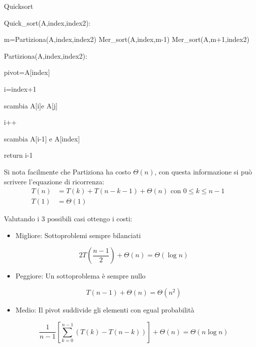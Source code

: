 \documentclass{article}
\begin{document}
\begin{algorithm}[ht]
\caption{Quicksort}
\begin{algorithmic}
\State Quick\_sort(A,index,index2):


        \State m=Partiziona(A,index,index2)
        \State Mer\_sort(A,index,m-1)
        \State Mer\_sort(A,m+1,index2)

    \EndIf

\State

\State Partiziona(A,index,index2): 

    \State pivot=A[index]

    \State i=index+1



            \State scambia A[i]e A[j]

            \State i++

        \EndIf

    \EndFor

\State scambia A[i-1] e A[index]

\State return i-1

\end{algorithmic}
\end{algorithm}

\noindent Si nota facilmente che Partiziona ha costo $\Theta(n)$, con questa informazione si può scrivere l'equazione di ricorrenza:
\begin{equation}
    \nonumber
    \begin{split}
        T(n)&=T(k)+T(n-k-1)+\Theta(n)\text{ con $0\leq k\leq n-1$}\\
        T(1)&=\Theta(1)
    \end{split}
\end{equation}

\noindent Valutando i 3 possibili casi ottengo i costi:
\begin{itemize}

    \item Migliore: Sottoproblemi sempre bilanciati 

    $$2T(\frac{n-1}{2})+\Theta(n)=\Theta(\log n)$$

    \item Peggiore: Un sottoproblema è sempre nullo

    $$T(n-1)+\Theta(n)=\Theta(n^2)$$

    \item Medio: Il pivot suddivide gli elementi con egual probabilità

    $$\frac{1}{n-1}\left[ \sum_{k=0}^{n-1}(T(k)-T(n-k))\right]+\Theta(n)=\Theta(n\log n)$$
    
\end{itemize}
\end{document}
